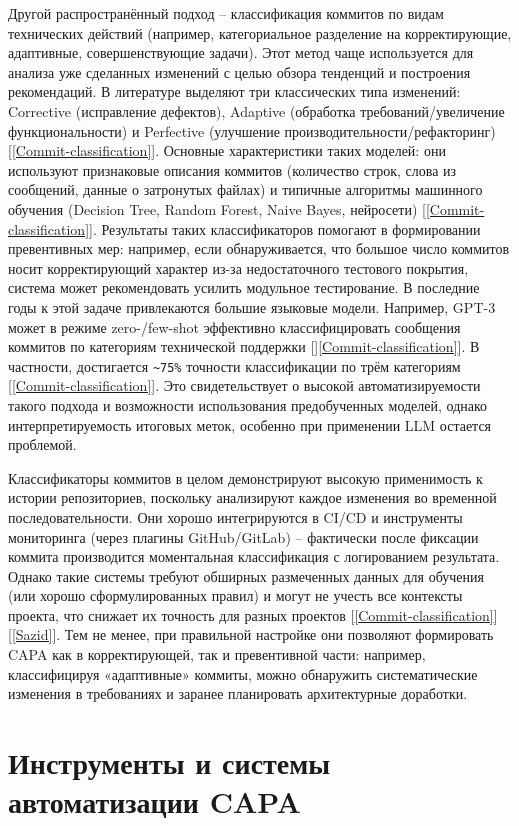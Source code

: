 Другой распространённый подход – классификация коммитов по видам технических действий (например, категориальное разделение на корректирующие, адаптивные, совершенствующие задачи). Этот метод чаще используется для анализа уже сделанных изменений с целью обзора тенденций и построения рекомендаций. В литературе выделяют три классических типа изменений: Corrective (исправление дефектов), Adaptive (обработка требований/увеличение функциональности) и Perfective (улучшение производительности/рефакторинг) [\ref{Commit-classification}]. Основные характеристики таких моделей: они используют признаковые описания коммитов (количество строк, слова из сообщений, данные о затронутых файлах) и типичные алгоритмы машинного обучения (Decision Tree, Random Forest, Naive Bayes, нейросети) [\ref{Commit-classification}]. Результаты таких классификаторов помогают в формировании превентивных мер: например, если обнаруживается, что большое число коммитов носит корректирующий характер из-за недостаточного тестового покрытия, система может рекомендовать усилить модульное тестирование. В последние годы к этой задаче привлекаются большие языковые модели. Например, GPT-3 может в режиме zero-/few-shot эффективно классифицировать сообщения коммитов по категориям технической поддержки []\ref{Commit-classification}]. В частности, достигается \verb|~75%| точности классификации  по трём категориям [\ref{Commit-classification}].
Это свидетельствует о высокой автоматизируемости такого подхода и возможности использования предобученных моделей, однако интерпретируемость итоговых меток, особенно при применении LLM остается проблемой.

Классификаторы коммитов в целом демонстрируют высокую применимость к истории репозиториев, поскольку анализируют каждое изменения во временной последовательности. Они хорошо интегрируются в CI/CD и инструменты мониторинга (через плагины GitHub/GitLab) – фактически после фиксации коммита производится моментальная классификация с логированием результата. Однако такие системы требуют обширных размеченных данных для обучения (или хорошо сформулированных правил) и могут не учесть все контексты проекта, что снижает их точность для разных проектов [\ref{Commit-classification}][\ref{Sazid}]. Тем не менее, при правильной настройке они позволяют формировать CAPA как в корректирующей, так и превентивной части: например, классифицируя «адаптивные» коммиты, можно обнаружить систематические изменения в требованиях и заранее планировать архитектурные доработки.

\section{Инструменты и системы автоматизации CAPA} \label{ch1:sec4}

